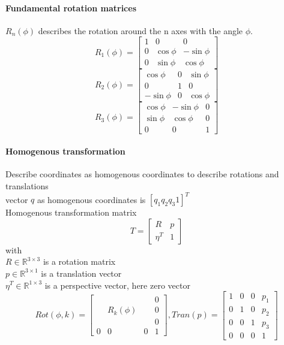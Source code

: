 \documentclass[12pt]{article}
\newcommand{\R}{\mathbb{R}}
\begin{document}
	\paragraph{Fundamental rotation matrices} $R_{n}(\phi)$ describes the rotation around the n axes with the angle $\phi$.\\
	\begin{equation}
	R_{1}(\phi) = 
	\begin{bmatrix}
	1 & 0 & 0\\
	0 & \cos \phi & -\sin \phi\\
	0 & \sin \phi & \cos \phi
	\end{bmatrix}
	\end{equation}
	\begin{equation}
	R_{2}(\phi) = 
	\begin{bmatrix}
	\cos \phi & 0 & \sin \phi\\
	0 & 1 & 0\\
	-\sin \phi & 0 & \cos \phi
	\end{bmatrix}
	\end{equation}
	\begin{equation}
	R_{3}(\phi) = 
	\begin{bmatrix}
	\cos \phi & -\sin \phi & 0\\
	\sin \phi & \cos \phi & 0\\
	0 & 0 & 1
	\end{bmatrix}
	\end{equation}
	
	\paragraph{Homogenous transformation} Describe coordinates as homogenous coordinates to describe rotations and translations\\
	vector $q$ as homogenous coordinates is $[q_{1} q_{2} q_{3} 1]^T$\\
	Homogenous transformation matrix
	\begin{equation}
	T = 
	\begin{bmatrix}
	R & p\\
	\eta^T & 1
	\end{bmatrix}
	\end{equation}
	with\\
	$R \in \R^{3 \times 3}$ is a rotation matrix\\
	$p \in \R^{3 \times 1}$ is a translation vector\\
	$\eta^T \in \R^{1 \times 3}$ is a perspective vector, here zero vector
	\begin{equation}
	Rot(\phi, k) = 
	\begin{bmatrix}
	& & & 0\\
	& R_{k}(\phi) & & 0\\
	& & & 0\\
	0 & 0 & 0 & 1
	\end{bmatrix}, 
	Tran(p) = 
	\begin{bmatrix}
	1 & 0 & 0 & p_{1}\\
	0 & 1 & 0 & p_{2}\\
	0 & 0 & 1 & p_{3}\\
	0 & 0 & 0 & 1
	\end{bmatrix}
	\end{equation}
\end{document}
